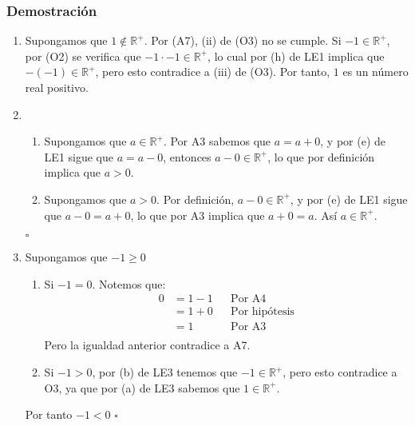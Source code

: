\documentclass[11pt]{article}
\begin{document}
\subsubsection*{Demostración}

\begin{enumerate}[label=\alph*),font=\bfseries]

    \item Supongamos que $1 \notin \mathbb{R}^+$. Por (A7), (ii) de (O3) no se cumple. Si $-1 \in \mathbb{R}^+$, por (O2) se verifica que $-1 \cdot -1 \in \mathbb{R}^+$, lo cual por (h) de LE1 implica que $-(-1) \in \mathbb{R}^+$, pero esto contradice a (iii) de (O3). Por tanto, $1$ es un número real positivo.


    \item \begin{enumerate}[label=\roman*),font=\bfseries]
        \item Supongamos que $a \in \mathbb{R}^+$. Por A3 sabemos que $a=a+0$, y por (e) de LE1 sigue que $a=a-0$, entonces $a-0 \in \mathbb{R}^+$, lo que por definición implica que $a>0$.
        \item Supongamos que $a>0$. Por definición, $a-0 \in \mathbb{R}^+$, y por (e) de LE1 sigue que $a-0=a+0$, lo que por A3 implica que $a+0=a$. Así $a \in \mathbb{R}^+$.
        \end{enumerate}
    \mbox{}\hfill $\square$


    \item Supongamos que $-1 \geq 0$
    \begin{enumerate}[label=\roman*),font=\bfseries]
        \item Si $-1=0$. Notemos que:
        \begin{align*}
        0 &= 1 - 1 && \text{Por A4}\\
        &= 1 + 0 && \text{Por hipótesis}\\
        &= 1 && \text{Por A3}\\
        \end{align*}
        Pero la igualdad anterior contradice a A7.
        \item Si $-1 > 0$, por (b) de LE3 tenemos que $-1 \in \mathbb{R}^+$, pero esto contradice a O3, ya que por (a) de LE3 sabemos que $1 \in \mathbb{R}^+$.
    \end{enumerate}
    Por tanto $-1<0$
    \mbox{}\hfill $\square$



\end{enumerate}
\end{document}
